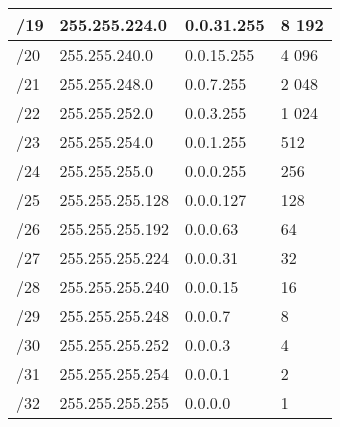 \documentclass[a4paper]{article}
\begin{document}
\begin{center}
\begin{tabular}{|p{3.75cm}|p{3.75cm}|p{3.75cm}|p{3.75cm}|}
        /19 & 255.255.224.0 & 0.0.31.255  & 8 192 \\ \hline
        /20 & 255.255.240.0 & 0.0.15.255  & 4 096 \\ \hline
        /21 & 255.255.248.0 & 0.0.7.255   & 2 048 \\ \hline
        /22 & 255.255.252.0 & 0.0.3.255   & 1 024 \\ \hline
        /23 & 255.255.254.0 & 0.0.1.255   & 512 \\ \hline
        /24 & 255.255.255.0 & 0.0.0.255   & 256 \\ \hline
        /25 & 255.255.255.128 & 0.0.0.127 & 128 \\ \hline
        /26 & 255.255.255.192 & 0.0.0.63  & 64 \\ \hline
        /27 & 255.255.255.224 & 0.0.0.31  & 32 \\ \hline
        /28 & 255.255.255.240 & 0.0.0.15  & 16 \\ \hline
        /29 & 255.255.255.248 & 0.0.0.7   & 8 \\ \hline
        /30 & 255.255.255.252 & 0.0.0.3   & 4 \\ \hline
        /31 & 255.255.255.254 & 0.0.0.1   & 2 \\ \hline
        /32 & 255.255.255.255 & 0.0.0.0   & 1 \\ \hline
    \end{tabular}
\end{center}




















\newpage

\tableofcontents
\end{document}
